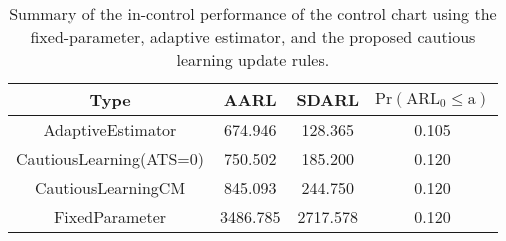 \begin{table}[!h]

\caption{Summary of the in-control performance of the control chart using the fixed-parameter, adaptive estimator, and the proposed cautious learning update rules.}
\centering
\begin{tabular}[t]{cccc}
\toprule
Type & AARL & SDARL & $\text{Pr}(\text{ARL}_0 \leq \text{a})$\\
\midrule
AdaptiveEstimator & 674.946 & 128.365 & 0.105\\
CautiousLearning(ATS=0) & 750.502 & 185.200 & 0.120\\
CautiousLearningCM & 845.093 & 244.750 & 0.120\\
FixedParameter & 3486.785 & 2717.578 & 0.120\\
\bottomrule
\end{tabular}
\end{table}
